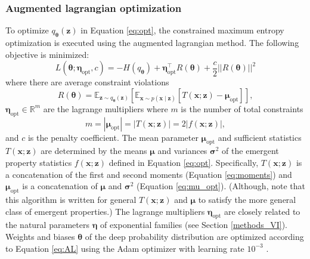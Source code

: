 \documentclass[11pt]{article}
\begin{document}
\subsubsection{Augmented lagrangian optimization}\label{methods_AL_opt}
To optimize $q_{\bm{\theta}}(\mathbf{z})$ in Equation \ref{eq:opt}, the constrained maximum entropy optimization is executed using the augmented lagrangian method.  
The following objective is minimized:
\begin{equation} \label{eq:AL}
L(\bm{\theta}; \bm{\eta}_{\text{opt}}, c) = -H(q_{\bm{\theta}}) + \bm{\eta}_{\text{opt}}^\top R(\bm{\theta}) + \frac{c}{2}||R(\bm{\theta})||^2
\end{equation}
where there are average constraint violations 
\begin{equation}
R(\bm{\theta}) = \mathbb{E}_{\mathbf{z} \sim q_{\bm{\theta}}(\mathbf{z})}\left[ \mathbb{E}_{\mathbf{x}\sim p(\mathbf{x} \mid \mathbf{z})}\left[T(\mathbf{x}; \mathbf{z}) - \bm{\mu}_{\text{opt}} \right] \right],
\end{equation}
 $\bm{\eta}_{\text{opt}} \in \mathbb{R}^m$ are the lagrange multipliers where $m$ is the number of total constraints
\begin{equation}
m = |\bm{\mu}_{\text{opt}}| = |T(\mathbf{x}; \mathbf{z})| = 2|f(\mathbf{x}; \mathbf{z})|,
\end{equation}
and $c$ is the penalty coefficient. 
The mean parameter $\bm{\mu}_{\text{opt}}$ and sufficient statistics $T(\mathbf{x}; \mathbf{z})$ are determined by the means $\bm{\mu}$ and variances $\bm{\sigma}^2$ of the emergent property statistics $f(\mathbf{x}; \mathbf{z})$ defined in Equation \ref{eq:opt}.
Specifically, $T(\mathbf{x}; \mathbf{z})$ is a concatenation of the first and second moments (Equation \ref{eq:moments}) and $\bm{\mu}_{\text{opt}}$ is a concatenation of $\bm{\mu}$ and $\bm{\sigma}^2$ (Equation \ref{eq:mu_opt}).
(Although, note that this algorithm is written for general $T(\mathbf{x}; \mathbf{z})$ and $\bm{\mu}$ to satisfy the more general class of emergent properties.)
The lagrange multipliers $\bm{\eta}_{\text{opt}}$ are closely related to the natural parameters $\bm{\eta}$ of exponential families (see Section \ref{methods_VI}).
Weights and biases $\bm{\theta}$ of the deep probability distribution are optimized according to Equation \ref{eq:AL} using the Adam optimizer with learning rate $10^{-3}$ \cite{kingma2014adam}.
\end{document}
